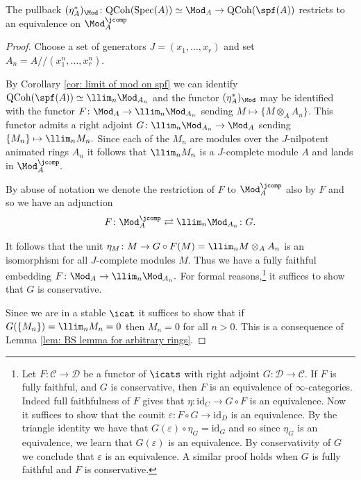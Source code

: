 \documentclass[10pt,reqno]{amsart}
\numberwithin{equation}{section}
\newcommand{\cD}{{\mathcal{D}}}
\newcommand{\cC}{\mathcal{C}}
\newcommand{\spec}{{\mathrm{Spec}}}
\newcommand{\Qcoh}{\mathrm{QCoh}}
\newcommand{\id}{\mathrm{id}}
\begin{document}
\begin{theorem}\label{thm: mod on spf}
    The pullback $(\eta_A^*)_{\Mod}\colon \Qcoh(\spec(A))\simeq \Mod_A\to  \Qcoh(\spf(A))$ restricts to an equivalence on $\Mod_A^\jcomp$
\end{theorem}
\begin{proof}
    Choose a set of generators $J=(x_1,\ldots, x_r)$ and set $A_n=A/\!\!/(x_1^n,\ldots, x_r^n).$

    By Corollary \ref{cor: limit of mod on spf} we can identify $\Qcoh(\spf(A))\simeq \llim_n\Mod_{A_n}$ and the functor $(\eta_A^*)_{\Mod}$ may be identified with the functor $F\colon \Mod_A\to \llim_n \Mod_{A_n}$ sending $M\mapsto \{M\otimes_A A_n\}$. This functor admits a right adjoint $G\colon \llim_n \Mod_{A_n}\to \Mod_A$ sending $\{M_n\}\mapsto \llim_n M_n.$ Since each of the $M_n$ are modules over the $J$-nilpotent animated rings $A_n$  it follows that $\llim_n M_n$ is a $J$-complete module $A$ and lands in $\Mod_A^\jcomp.$
    
    By abuse of notation we denote the restriction of $F$ to $\Mod_A^\jcomp$ also by $F$ and so we have an adjunction 
    $$F \colon \Mod_A^\jcomp \rightleftarrows \llim_n\Mod_{A_n}\colon G .$$
    
    It follows that the unit $\eta_M \colon M\to G\circ F(M)=\llim_n M\otimes_A A_n$ is an isomorphism for all $J$-complete modules $M$. Thus we have a fully faithful embedding $F\colon \Mod_A\to \llim_n \Mod_{A_n}.$  For formal reasons,\footnote{Let $F\colon \cC\to \cD$ be a functor of $\icats$ with right adjoint $G\colon  \cD\to \cC$. If $F$ is fully faithful, and $G$ is conservative, then $F$ is an equivalence of $\infty$-categories. Indeed full faithfulness of $F$ gives that $\eta\colon \id_C\to  G\circ F$ is an equivalence. Now it suffices to show that the counit $\varepsilon\colon F\circ G\to \id_D$ is an equivalence. By the triangle identity we have that $G(\varepsilon)\circ \eta_G=\id_G$ and so since $\eta_G$ is an equivalence, we learn that $G(\varepsilon)$ is an equivalence. By conservativity of $G$ we conclude that $\varepsilon$ is an equivalence. A similar proof holds when $G$ is fully faithful and $F$ is conservative.} it suffices to show that $G$ is conservative.
    
    Since we are in a stable $\icat$ it suffices to show that if $G(\{M_n\})=\llim_n M_n=0$ then $M_n=0$ for all $n>0.$ This is a consequence of Lemma \ref{lem: BS lemma for arbitrary rings}. 
\end{proof}
\end{document}
